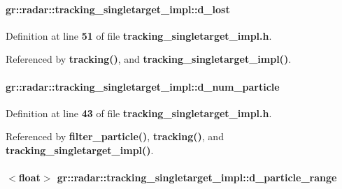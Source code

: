 \paragraph[{d\+\_\+lost}]{ gr\+::radar\+::tracking\+\_\+singletarget\+\_\+impl\+::d\+\_\+lost}\label{classgr_1_1radar_1_1tracking__singletarget__impl_a78731bd59c11db4363b3d4a2aab7af55}


Definition at line {\bf 51} of file {\bf tracking\+\_\+singletarget\+\_\+impl.\+h}.



Referenced by {\bf tracking()}, and {\bf tracking\+\_\+singletarget\+\_\+impl()}.

\paragraph[{d\+\_\+num\+\_\+particle}]{ gr\+::radar\+::tracking\+\_\+singletarget\+\_\+impl\+::d\+\_\+num\+\_\+particle}\label{classgr_1_1radar_1_1tracking__singletarget__impl_a9ae3aed3ca714c787253291162fb21f4}


Definition at line {\bf 43} of file {\bf tracking\+\_\+singletarget\+\_\+impl.\+h}.



Referenced by {\bf filter\+\_\+particle()}, {\bf tracking()}, and {\bf tracking\+\_\+singletarget\+\_\+impl()}.

\paragraph[{d\+\_\+particle\+\_\+range}]{$<$float$>$ gr\+::radar\+::tracking\+\_\+singletarget\+\_\+impl\+::d\+\_\+particle\+\_\+range}\label{classgr_1_1radar_1_1tracking__singletarget__impl_a2af18382508789e6624e01c23dfed2e4}


